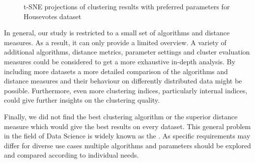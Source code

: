 
\begin{figure}[H]
	\centering
	\caption{t-SNE projections of clustering results with preferred parameters for Housevotes dataset}
	\label{fig:housevotes_bestparams}
\end{figure}

In general, our study is restricted to a small set of algorithms and distance measures. As a result, it can only provide a limited overview. A variety of additional algorithms, distance metrics, parameter settings and cluster evaluation measures could be considered to get a more exhaustive in-depth analysis. By including more datasets a more detailed comparison of the algorithms and distance measures and their behaviour on differently distributed data might be possible. Furthermore, even more clustering indices, particularly internal indices, could give further insights on the clustering quality.

Finally, we did not find the best clustering algorithm or the superior distance measure which would give the best results on every dataset. This general problem in the field of Data Science is widely known as the  \cite{nofreelunch}. As specific requirements may differ for diverse use cases multiple algorithms and parameters should be explored and compared according to individual needs. 
